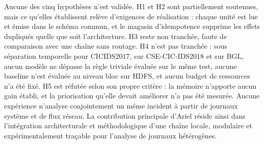 Aucune des cinq hypothèses n'est validée. H1 et H2 sont partiellement
soutenues, mais ce qu'elles établissent relève d'exigences de réalisation :
chaque unité est lue et émise dans le schéma commun, et le magasin
d'idempotence supprime les effets dupliqués quelle que soit l'architecture.
H3 reste non tranchée, faute de comparaison avec une chaîne sans routage. H4
n'est pas tranchée : sous séparation temporelle pour CICIDS2017, sur
CSE-CIC-IDS2018 et sur BGL, aucun modèle ne dépasse la règle triviale évaluée
sur le même test, aucune baseline n'est évaluée au niveau bloc sur HDFS, et
aucun budget de ressources n'a été fixé. H5 est réfutée selon son propre
critère : la mémoire n'apporte aucun gain établi, et la priorisation qu'elle
devait améliorer n'a pas été mesurée. Aucune expérience n'analyse
conjointement un même incident à partir de journaux système et de flux
réseau. La contribution principale d'Ariel \logminer{} réside ainsi dans
l'intégration architecturale et méthodologique d'une chaîne locale, modulaire
et expérimentalement traçable pour l'analyse de journaux hétérogènes.
